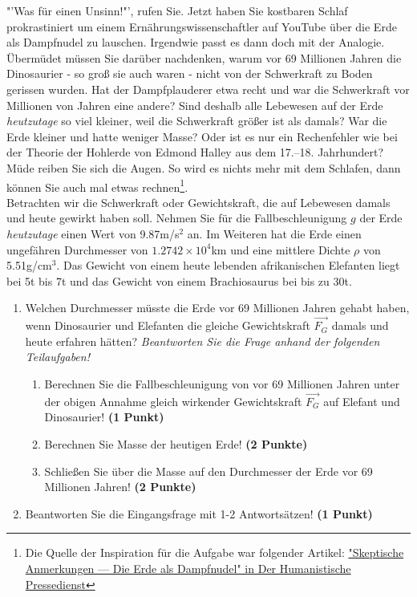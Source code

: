 \documentclass[a4paper, 9pt]{scrartcl}\usepackage[]{graphicx}\usepackage[]{xcolor}
\begin{document}
"'Was für einen Unsinn!"', rufen Sie. Jetzt haben Sie kostbaren Schlaf prokrastiniert um einem Ernährungswissenschaftler auf YouTube über die Erde als Dampfnudel zu lauschen. Irgendwie passt es dann doch mit der Analogie. Übermüdet müssen Sie darüber nachdenken, warum vor 69 Millionen Jahren die Dinosaurier - so groß sie auch waren - nicht von der Schwerkraft zu Boden gerissen wurden. Hat der Dampfplauderer etwa recht und war die Schwerkraft vor Millionen von Jahren eine andere?  Sind deshalb alle Lebewesen auf der Erde \textit{heutzutage} so viel kleiner, weil die Schwerkraft größer ist als damals? War die Erde kleiner und hatte weniger Masse? Oder ist es nur ein Rechenfehler wie bei der Theorie der Hohlerde von Edmond Halley aus dem 17.–18. Jahrhundert? Müde reiben Sie sich die Augen. So wird es nichts mehr mit dem Schlafen, dann können Sie auch mal etwas rechnen\footnote{Die Quelle der Inspiration
  für die Aufgabe war folgender Artikel:
  \href{https://hpd.de/artikel/erde-dampfnudel-22236}{"Skeptische Anmerkungen --- Die Erde als Dampfnudel" in Der Humanistische Pressedienst}}.  \\

Betrachten wir die Schwerkraft oder Gewichtskraft, die auf Lebewesen damals und heute gewirkt haben soll. Nehmen Sie für die Fallbeschleunigung $g$ der Erde \textit{heutzutage} einen Wert von 9.87m/s$^2$ an. Im Weiteren hat die Erde einen ungefähren Durchmesser von \ensuremath{1.2742\times 10^{4}}km und eine mittlere Dichte $\rho$ von 5.51g/cm$^3$. Das Gewicht von einem heute lebenden afrikanischen Elefanten liegt bei 5t bis 7t und das Gewicht von einem Brachiosaurus bei bis zu 30t.

\begin{enumerate}
\item Welchen Durchmesser müsste die Erde vor 69 Millionen Jahren gehabt haben, wenn Dinosaurier und Elefanten die gleiche Gewichtskraft $\overrightarrow{F_G}$ damals und heute erfahren hätten? \textit{Beantworten Sie die Frage anhand der folgenden Teilaufgaben!}
\begin{enumerate}
\item Berechnen Sie die Fallbeschleunigung von vor 69 Millionen Jahren unter der obigen Annahme gleich wirkender Gewichtskraft $\overrightarrow{F_G}$ auf Elefant und Dinosaurier! \textbf{(1 Punkt)}
\item Berechnen Sie Masse der heutigen Erde! \textbf{(2 Punkte)}
\item Schließen Sie über die Masse auf den Durchmesser der Erde vor 69 Millionen Jahren! \textbf{(2 Punkte)}
\end{enumerate}
\item Beantworten Sie die Eingangsfrage mit 1-2 Antwortsätzen! \textbf{(1 Punkt)}
\end{enumerate}
\end{document}
